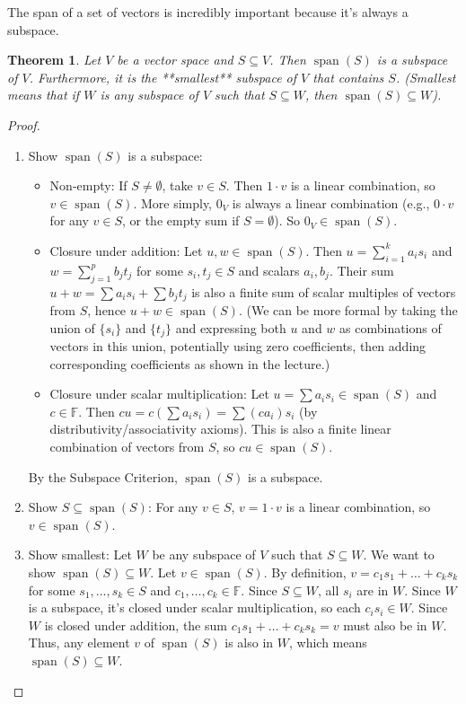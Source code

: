 \documentclass[11pt]{article}
\newtheorem{theorem}{Theorem}[section]
\theoremstyle{definition}
\theoremstyle{remark}
\newcommand{\F}{\mathbb{F}} %
\DeclareMathOperator{\Span}{span}
\begin{document}
The span of a set of vectors is incredibly important because it's always a subspace.

\begin{theorem}
Let $V$ be a vector space and $S \subseteq V$. Then $\Span(S)$ is a subspace of $V$. Furthermore, it is the **smallest** subspace of $V$ that contains $S$. (Smallest means that if $W$ is any subspace of $V$ such that $S \subseteq W$, then $\Span(S) \subseteq W$).
\end{theorem}

\begin{proof}
\begin{enumerate}
    \item Show $\Span(S)$ is a subspace:
        \begin{itemize}
            \item Non-empty: If $S \neq \emptyset$, take $v \in S$. Then $1 \cdot v$ is a linear combination, so $v \in \Span(S)$. More simply, $0_V$ is always a linear combination (e.g., $0 \cdot v$ for any $v \in S$, or the empty sum if $S=\emptyset$). So $0_V \in \Span(S)$.
            \item Closure under addition: Let $u, w \in \Span(S)$. Then $u = \sum_{i=1}^k a_i s_i$ and $w = \sum_{j=1}^p b_j t_j$ for some $s_i, t_j \in S$ and scalars $a_i, b_j$. Their sum $u+w = \sum a_i s_i + \sum b_j t_j$ is also a finite sum of scalar multiples of vectors from $S$, hence $u+w \in \Span(S)$. (We can be more formal by taking the union of $\{s_i\}$ and $\{t_j\}$ and expressing both $u$ and $w$ as combinations of vectors in this union, potentially using zero coefficients, then adding corresponding coefficients as shown in the lecture.)
            \item Closure under scalar multiplication: Let $u = \sum a_i s_i \in \Span(S)$ and $c \in \F$. Then $c u = c (\sum a_i s_i) = \sum (c a_i) s_i$ (by distributivity/associativity axioms). This is also a finite linear combination of vectors from $S$, so $c u \in \Span(S)$.
        \end{itemize}
        By the Subspace Criterion, $\Span(S)$ is a subspace.

    \item Show $S \subseteq \Span(S)$: For any $v \in S$, $v = 1 \cdot v$ is a linear combination, so $v \in \Span(S)$.

    \item Show smallest: Let $W$ be any subspace of $V$ such that $S \subseteq W$. We want to show $\Span(S) \subseteq W$.
        Let $v \in \Span(S)$. By definition, $v = c_1 s_1 + \dots + c_k s_k$ for some $s_1, \dots, s_k \in S$ and $c_1, \dots, c_k \in \F$.
        Since $S \subseteq W$, all $s_i$ are in $W$.
        Since $W$ is a subspace, it's closed under scalar multiplication, so each $c_i s_i \in W$.
        Since $W$ is closed under addition, the sum $c_1 s_1 + \dots + c_k s_k = v$ must also be in $W$.
        Thus, any element $v$ of $\Span(S)$ is also in $W$, which means $\Span(S) \subseteq W$.
\end{enumerate}
\end{proof}
\end{document}

